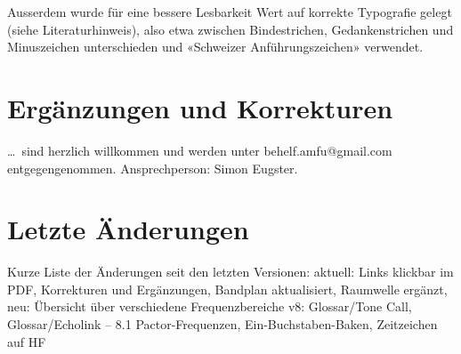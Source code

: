 Ausserdem wurde für eine bessere Lesbarkeit Wert auf korrekte Typografie gelegt (siehe Literaturhinweis), also etwa zwischen Bindestrichen, Gedankenstrichen und Minuszeichen unterschieden und «Schweizer Anführungszeichen» verwendet. 

\section{Ergänzungen und Korrekturen}
\dots\ sind herzlich willkommen und werden unter behelf.amfu@gmail.com entgegengenommen. Ansprechperson: Simon Eugster. 

\section{Letzte Änderungen}
Kurze Liste der Änderungen seit den letzten Versionen:
aktuell: Links klickbar im PDF, Korrekturen und Ergänzungen, Bandplan aktualisiert, Raumwelle ergänzt, neu: Übersicht über verschiedene Frequenzbereiche
v8: Glossar/Tone Call, Glossar/Echolink – 8.1 Pactor-Frequenzen, Ein-Buchstaben-Baken, Zeitzeichen auf HF